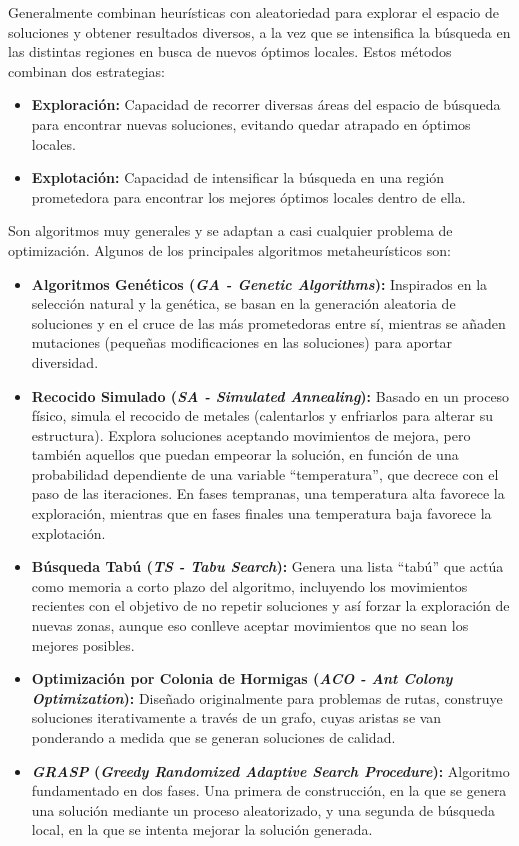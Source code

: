 \documentclass[12pt,a4paper]{book}
\begin{document}
Generalmente combinan heurísticas con aleatoriedad para explorar el espacio de soluciones y obtener resultados diversos, a la vez que se intensifica la búsqueda en las distintas regiones en busca de nuevos óptimos locales. Estos métodos combinan dos estrategias:
\begin{itemize}
    \item \textbf{Exploración:} Capacidad de recorrer diversas áreas del espacio de búsqueda para encontrar nuevas soluciones, evitando quedar atrapado en óptimos locales.
    \item \textbf{Explotación:} Capacidad de intensificar la búsqueda en una región prometedora para encontrar los mejores óptimos locales dentro de ella.
\end{itemize}

Son algoritmos muy generales y se adaptan a casi cualquier problema de optimización. Algunos de los principales algoritmos metaheurísticos son:
\begin{itemize}
    \item \textbf{Algoritmos Genéticos (\textit{GA - Genetic Algorithms}):}
    Inspirados en la selección natural y la genética, se basan en la generación aleatoria de soluciones y en el cruce de las más prometedoras entre sí, 
    mientras se añaden mutaciones (pequeñas modificaciones en las soluciones) para aportar diversidad.
    
    \item \textbf{Recocido Simulado (\textit{SA - Simulated Annealing}):}
    Basado en un proceso físico, simula el recocido de metales (calentarlos y enfriarlos para alterar su estructura). Explora soluciones aceptando movimientos de mejora, pero también aquellos que puedan empeorar la solución, 
    en función de una probabilidad dependiente de una variable ``temperatura'', que decrece con el paso de las iteraciones. En fases tempranas, una temperatura alta favorece la exploración, mientras que en fases finales una temperatura baja favorece la explotación.
    
    \item \textbf{Búsqueda Tabú (\textit{TS - Tabu Search}):}
    Genera una lista ``tabú'' que actúa como memoria a corto plazo del algoritmo, incluyendo los movimientos recientes con el objetivo de no repetir soluciones y así forzar la exploración de nuevas zonas, aunque eso conlleve aceptar movimientos que no sean los mejores posibles.
    
    \item \textbf{Optimización por Colonia de Hormigas (\textit{ACO - Ant Colony Optimization}):}
    Diseñado originalmente para problemas de rutas, construye soluciones iterativamente a través de un grafo, cuyas aristas se van ponderando a medida que se generan soluciones de calidad.
    
    \item \textbf{\textit{GRASP} (\textit{Greedy Randomized Adaptive Search Procedure}):}
    Algoritmo fundamentado en dos fases. Una primera de construcción, en la que se genera una solución mediante un proceso aleatorizado, y una segunda de búsqueda local, en la que se intenta mejorar la solución generada.
\end{itemize}
\end{document}
